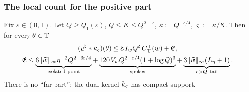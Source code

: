\subsubsection*{The local count for the positive part}

\begin{lemma}\label{lem:C}
Fix $\varepsilon\in(0,1)$. Let $Q\ge Q_1(\varepsilon)$, $Q\le K\le Q^{2-\varepsilon}$, $\kappa:=Q^{-\varepsilon/4}$, $\varsigma:=\kappa/K$. Then for every
$\theta\in\mathbb{T}$
\begin{gather*}
 (\mu^\natural*k_{\varsigma})(\theta)\le\mathcal{E}I_w Q^2\,C^{+}_{\mathrm T}(w)+\mathfrak E,\\
 \mathfrak E\le\underbrace{6\|\widetilde w\|_\infty\eta^{-2}Q^{2-3\varepsilon/4}}_{\text{isolated point}}
 +\underbrace{120\,V_wQ^{2-\varepsilon/4}(1+\log Q)^3}_{\text{spokes}}
 +\underbrace{3\|\widetilde w\|_\infty(L_\eta+1)}_{r>Q\ \text{tail}} .
\end{gather*}
There is no ``far part'': the dual kernel $k_{\varsigma}$ has compact support.
\end{lemma}

